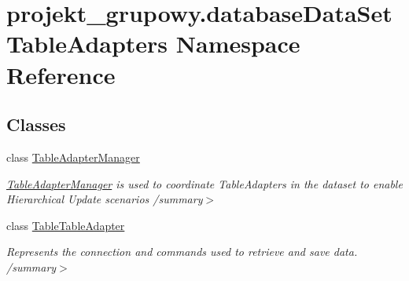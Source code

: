 \hypertarget{namespaceprojekt__grupowy_1_1database_data_set_table_adapters}{}\section{projekt\+\_\+grupowy.\+database\+Data\+Set\+Table\+Adapters Namespace Reference}
\label{namespaceprojekt__grupowy_1_1database_data_set_table_adapters}
\subsection*{Classes}
\begin{DoxyCompactItemize}
\item 
class \hyperlink{classprojekt__grupowy_1_1database_data_set_table_adapters_1_1_table_adapter_manager}{Table\+Adapter\+Manager}
\begin{DoxyCompactList}\small\item\em \hyperlink{classprojekt__grupowy_1_1database_data_set_table_adapters_1_1_table_adapter_manager}{Table\+Adapter\+Manager} is used to coordinate Table\+Adapters in the dataset to enable Hierarchical Update scenarios /summary$>$ \end{DoxyCompactList}\item 
class \hyperlink{classprojekt__grupowy_1_1database_data_set_table_adapters_1_1_table_table_adapter}{Table\+Table\+Adapter}
\begin{DoxyCompactList}\small\item\em Represents the connection and commands used to retrieve and save data. /summary$>$ \end{DoxyCompactList}\end{DoxyCompactItemize}

